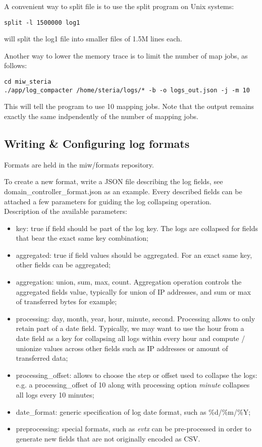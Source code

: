 \documentclass[twoside,11pt]{article}
\begin{document}
A convenient way to split file is to use the split program on Unix systems:
\begin{verbatim}
split -l 1500000 log1
\end{verbatim}
will split the log1 file into smaller files of 1.5M lines each.

Another way to lower the memory trace is to limit the number of map jobs, as follows:
\begin{verbatim}
cd miw_steria
./app/log_compacter /home/steria/logs/* -b -o logs_out.json -j -m 10
\end{verbatim}
This will tell the program to use 10 mapping jobs. Note that the output remains exactly the same indpendently of the number of mapping jobs.

\subsection{Writing \& Configuring log formats}
Formats are held in the miw\//formats repository.

To create a new format, write a JSON file describing the log fields, see domain\_controller\_format.json as an example.
Every described fields can be attached a few parameters for guiding the log collapsing operation.\\

Description of the available parameters:
\begin{itemize}
\item key: true if field should be part of the log key. The logs are collapsed for fields that bear the exact same key combination;
\item aggregated: true if field values should be aggregated. For an exact same key, other fields can be aggregated;
\item aggregation: union, sum, max, count. Aggregation operation controls the aggregated fields value, typically for union of IP addresses, and sum or max of transferred bytes for example;
\item processing: day, month, year, hour, minute, second. Processing allows to only retain part of a date field. Typically, we may want to use the hour from a date field as a key for collapsing all logs within every hour and compute / unionize values across other fields such as IP addresses or amount of transferred data;
\item processing\_offset: allows to choose the step or offset used to collapse the logs: e.g. a processing\_offset of 10 along with processing option \emph{minute} collapses all logs every 10 minutes;
\item date\_format: generic specification of log date format, such as \%d/\%m/\%Y;
\item preprocessing: special formats, such as \emph{evtx} can be pre-processed in order to generate new fields that are not originally encoded as CSV.
\end{itemize}
\end{document}
